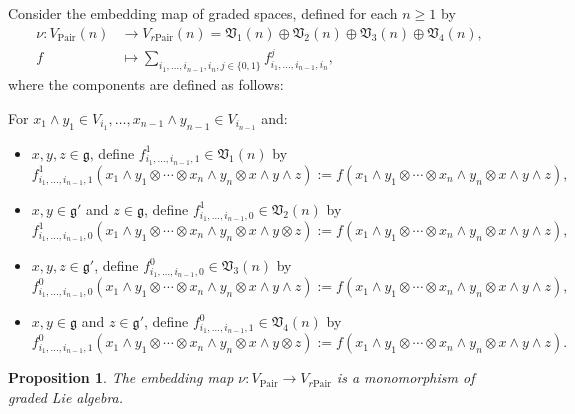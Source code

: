 \documentclass[12pt]{amsart}
\newtheorem{prop}[theorem]{Proposition}
\theoremstyle{definition}
\begin{document}
Consider the embedding map of graded spaces, defined for each $n \geq 1$ by
\begin{align*}
	\nu\colon V_{\mathrm{Pair}}(n)
	&\longrightarrow V_{r\mathrm{Pair}}(n) = \mathfrak{V}_1(n) \oplus \mathfrak{V}_2(n) \oplus \mathfrak{V}_3(n) \oplus \mathfrak{V}_4(n),  \\
	f
	&\longmapsto \sum_{i_1,\ldots,i_{n-1}, i_{n}, j \in \{0,1\}} f_{i_1,\ldots,i_{n-1}, i_{n}}^j,
\end{align*}
where the components are defined as follows:

For $x_1 \wedge y_1 \in V_{i_1}, \ldots, x_{n-1} \wedge y_{n-1} \in V_{i_{n-1}}$ and:
\begin{itemize}
	\item [(i)]$x, y, z \in \mathfrak{g}$, define $f_{i_1,\ldots,i_{n-1},1}^1 \in \mathfrak{V}_1(n)$ by
	\[
	f_{i_1,\ldots,i_{n-1},1}^1(x_1 \wedge y_1 \otimes \cdots \otimes x_n \wedge y_n \otimes x \wedge y \wedge z) := f(x_1 \wedge y_1 \otimes \cdots \otimes x_n \wedge y_n \otimes x \wedge y \wedge z),
	\]
	\item [(ii)]$x, y \in \mathfrak{g}'$ and $z \in \mathfrak{g}$, define $f_{i_1,\ldots,i_{n-1},0}^1 \in \mathfrak{V}_2(n)$ by
	\[
	f_{i_1,\ldots,i_{n-1},0}^1(x_1 \wedge y_1 \otimes \cdots \otimes x_n \wedge y_n \otimes x \wedge y \otimes z) := f(x_1 \wedge y_1 \otimes \cdots \otimes x_n \wedge y_n \otimes x \wedge y \wedge z),
	\]
	\item [(iii)]$x, y, z \in \mathfrak{g}'$, define $f_{i_1,\ldots,i_{n-1},0}^0 \in \mathfrak{V}_3(n)$ by
	\[
	f_{i_1,\ldots,i_{n-1},0}^0(x_1 \wedge y_1 \otimes \cdots \otimes x_n \wedge y_n \otimes x \wedge y \wedge z) := f(x_1 \wedge y_1 \otimes \cdots \otimes x_n \wedge y_n \otimes x \wedge y \wedge z),
	\]
	\item [(iv)]$x, y \in \mathfrak{g}$ and $z \in \mathfrak{g}'$, define $f_{i_1,\ldots,i_{n-1},1}^0 \in \mathfrak{V}_4(n)$ by
	\[
	f_{i_1,\ldots,i_{n-1},1}^0(x_1 \wedge y_1 \otimes \cdots \otimes x_n \wedge y_n \otimes x \wedge y \otimes z) := f(x_1 \wedge y_1 \otimes \cdots \otimes x_n \wedge y_n \otimes x \wedge y \wedge z).
	\]
\end{itemize}



	\begin{prop}\label{Prop: monomorphism of graded Lie alg}
The embedding map 	$\nu	 \colon V_{\mathrm{Pair}}
 \rightarrow V_{r\mathrm{Pair}}$  is a monomorphism of graded Lie algebra.
	\end{prop}
	
\end{document}
